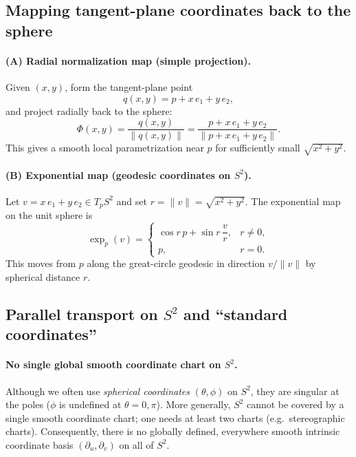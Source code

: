 \documentclass[12pt,a4paper]{article}
\theoremstyle{plain}
\theoremstyle{definition}      %
\begin{document}
	\subsection*{Mapping tangent-plane coordinates back to the sphere}
	
	\paragraph{(A) Radial normalization map (simple projection).}
	Given $(x,y)$, form the tangent-plane point
	\[
	q(x,y)=p+x\,e_1+y\,e_2,
	\]
	and project radially back to the sphere:
	\[
	\Phi(x,y)=\frac{q(x,y)}{\|q(x,y)\|}=
	\frac{p+x\,e_1+y\,e_2}{\|p+x\,e_1+y\,e_2\|}.
	\]
	This gives a smooth local parametrization near $p$ for sufficiently small $\sqrt{x^2+y^2}$.
	
	\paragraph{(B) Exponential map (geodesic coordinates on $S^2$).}
	Let $v=x\,e_1+y\,e_2\in T_pS^2$ and set $r=\|v\|=\sqrt{x^2+y^2}$.
	The exponential map on the unit sphere is
	\[
	\exp_p(v)=
	\begin{cases}
		\cos r\, p + \sin r\, \dfrac{v}{r}, & r\neq 0,\\[0.8em]
		p, & r=0.
	\end{cases}
	\]
	This moves from $p$ along the great-circle geodesic in direction $v/\|v\|$ by spherical distance $r$.
	
	
	
	\subsection*{Parallel transport on $S^2$ and ``standard coordinates''}
	
	\paragraph{No single global smooth coordinate chart on $S^2$.}
	Although we often use \emph{spherical coordinates} $(\theta,\phi)$ on $S^2$,
	they are singular at the poles ($\phi$ is undefined at $\theta=0,\pi$).
	More generally, $S^2$ cannot be covered by a single smooth coordinate chart;
	one needs at least two charts (e.g.\ stereographic charts).
	Consequently, there is no globally defined, everywhere smooth intrinsic coordinate basis
	$(\partial_{u},\partial_{v})$ on all of $S^2$.
	
\end{document}
